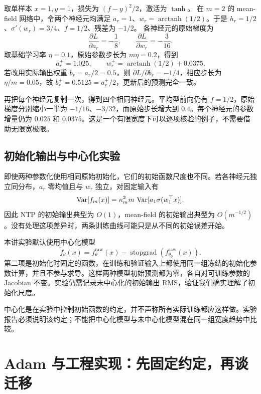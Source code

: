 \begin{example}[两神经元与四神经元的完整一步]
取单样本 $x=1,y=1$，损失为 $(f-y)^2/2$，激活为 $\tanh$。
在 $m=2$ 的 mean-field 网络中，令两个神经元均满足
$a_r=1$、$w_r=\operatorname{arctanh}(1/2)$。于是
$h_r=1/2$、$\sigma'(w_r)=3/4$、$f=1/2$、残差为 $-1/2$。
各神经元的原始梯度为
\[
 \frac{\partial L}{\partial a_r}=-\frac18,
 \qquad \frac{\partial L}{\partial w_r}=-\frac3{16}.
\]
取基础学习率 $\eta=0.1$，原始参数步长为 $m\eta=0.2$，得到
\[
 a_r^+=1.025,
 \qquad w_r^+=\operatorname{arctanh}(1/2)+0.0375.
\]
若改用实际输出权重 $b_r=a_r/2=0.5$，则
$\partial L/\partial b_r=-1/4$，相应步长为 $\eta/m=0.05$，故
$b_r^+=0.5125=a_r^+/2$，更新后的预测完全一致。

再把每个神经元复制一次，得到四个相同神经元。平均型前向仍有 $f=1/2$，原始梯度分别缩小一半为 $-1/16$、$-3/32$，而原始步长增大到 $0.4$。每个神经元的参数增量仍为 $0.025$ 和 $0.0375$。这是一个有限宽度下可以逐项核验的例子，不需要借助无限宽极限。
\end{example}

\subsection{初始化输出与中心化实验}

即使两种参数化使用相同原始初始化，它们的初始函数尺度也不同。若各神经元独立同分布，$a_r$ 零均值且与 $w_r$ 独立，对固定输入有
\begin{equation}
 \operatorname{Var}[f_m(x)]
 =\kappa_m^2m\,\operatorname{Var}[a_1\sigma(w_1^\top x)].
 \label{l5:init-output-variance}
\end{equation}
因此 NTP 的初始输出典型为 $O(1)$，mean-field 的初始输出典型为
$O(m^{-1/2})$。没有处理这项差异时，两条训练曲线可能只是从不同的初始误差开始。

本讲实验默认使用中心化模型
\begin{equation}
 \widetilde f_\theta(x)
 =f_\theta^{\mathrm{raw}}(x)
 -\operatorname{stopgrad}\!\left(f_{\theta_0}^{\mathrm{raw}}(x)\right).
 \label{l5:centered-output}
\end{equation}
第二项是初始化时固定的函数，在训练和验证输入上都使用同一组冻结的初始化参数计算，并且不参与求导。这样两种模型初始预测都为零，各自对可训练参数的 Jacobian 不变。实验仍需记录未中心化的初始输出 RMS，验证我们确实理解了初始化尺度。

中心化是在实验中控制初始函数的约定，并不声称所有实际训练都应这样做。实验报告必须说明该约定；不能把中心化模型与未中心化模型混在同一组宽度趋势中比较。

\section{Adam 与工程实现：先固定约定，再谈迁移}
\label{l5:adam-conventions}

